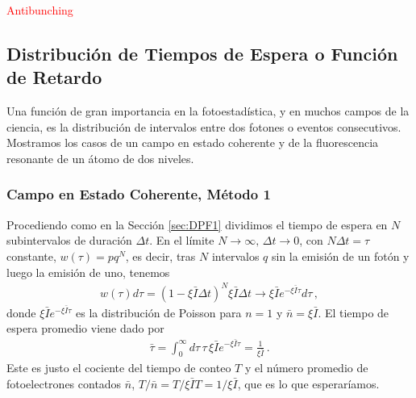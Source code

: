 \documentclass[twocolumn,aps,eqsecnum,showkeys,amsmath]{revtex4}
\begin{document}
\textcolor{red}{Antibunching}

\subsection{Distribuci\'on de Tiempos de Espera o Funci\'on de Retardo} 
Una funci\'on de gran importancia en la fotoestad\'istica, y en muchos 
campos de la ciencia, es la distribuci\'on de intervalos entre dos fotones 
o eventos consecutivos. Mostramos los casos de un campo en estado 
coherente y de la fluorescencia resonante de un \'atomo de dos niveles. 

\subsubsection{Campo en Estado Coherente, M\'etodo 1 
\cite{Carmichael93} }
Procediendo como en la Secci\'on \ref{sec:DPF1} dividimos el tiempo 
de espera en $N$ subintervalos de duraci\'on $\Delta t$. En el l\'imite 
$N \to \infty, \, \Delta t \to 0$, con $N \Delta t =\tau$ constante, 
$w(\tau) = p q^N$, es decir, tras $N$ intervalos $q$ sin la emisi\'on 
de un fot\'on y luego la emisi\'on de uno, tenemos 
%
\begin{eqnarray}
w(\tau) d\tau = ( 1-\xi \bar{I} \Delta t )^N \xi \bar{I} \Delta t 
	\to \xi \bar{I}  e^{ -\xi \bar{I} \tau} d\tau \,,
\end{eqnarray}
donde $\xi \bar{I} e^{ -\xi \bar{I} \tau}$ es la distribuci\'on de Poisson 
para $n=1$ y $\bar{n} = \xi \bar{I}$. El tiempo de espera promedio 
viene dado por 
%
\begin{eqnarray}
\bar{\tau} = \int_0^{\infty} d\tau \,\tau \, \xi \bar{I} e^{ -\xi  \bar{I} \tau} 
	= \frac{1}{\xi \bar{I} } \,.
\end{eqnarray}
Este es justo el cociente del tiempo de conteo $T$ y el n\'umero 
promedio de fotoelectrones contados 
$\bar{n}$, $T/\bar{n} = T/ \xi \bar{I} T = 1/ \xi \bar{I}$, que es lo que 
esperar\'iamos. 

\end{document}
